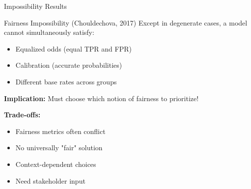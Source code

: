 \documentclass[aspectratio=169]{beamer}
\begin{document}
\begin{frame}{Impossibility Results}
  \begin{theorembox}{Fairness Impossibility (Chouldechova, 2017)}
    Except in degenerate cases, a model cannot simultaneously satisfy:
    \begin{itemize}
      \item Equalized odds (equal TPR and FPR)
      \item Calibration (accurate probabilities)
      \item Different base rates across groups
    \end{itemize}
  \end{theorembox}

  \vspace{0.5em}

  \textbf{Implication:} Must choose which notion of fairness to prioritize!

  \vspace{0.5em}

  \textbf{Trade-offs:}
  \begin{itemize}
    \item Fairness metrics often conflict
    \item No universally "fair" solution
    \item Context-dependent choices
    \item Need stakeholder input
  \end{itemize}
\end{frame}
\end{document}
